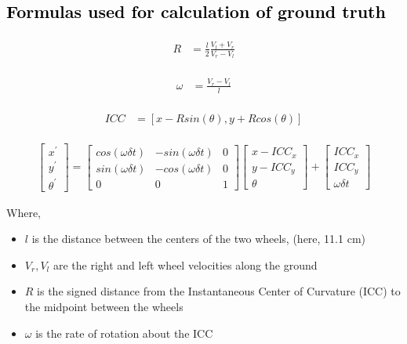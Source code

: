 \subsection{\textcolor{black}{Formulas used for calculation of ground truth}}

\begin{align} 
\begin{split}
R 	&= \frac{l}{2} \frac{V_l + V_r}{V_r - V_l}
\end{split}					
\end{align}

\begin{align} 
\begin{split}
\omega 	&= \frac{V_r - V_l}{l}
\end{split}					
\end{align}

\begin{align} 
\begin{split}
ICC 	&= [x - R sin(\theta), y + R cos(\theta)]
\end{split}					
\end{align}


\begin{align}
\begin{bmatrix}
x^{'} \\
y^{'} \\
\theta^{'}
\end{bmatrix}
= 
\begin{bmatrix}
cos(\omega \delta t) & -sin(\omega \delta t) & 0\\
sin(\omega \delta t) & -cos(\omega \delta t) & 0\\
0 & 0 & 1
\end{bmatrix}
\begin{bmatrix}
x - ICC_x\\
y - ICC_y \\
\theta
\end{bmatrix}
+
\begin{bmatrix}
ICC_x\\
ICC_y \\
\omega \delta t
\end{bmatrix}
\end{align}

Where,
\begin{itemize}
	\item $l$ is the distance between the centers of the two wheels, (here, 11.1 cm)
	\item $V_r, V_l$ are the right and left wheel velocities along the ground
	\item $R$ is the signed distance from the Instantaneous Center of Curvature (ICC) to the midpoint between the wheels
	\item $\omega$ is the rate of rotation about the ICC
\end{itemize}
